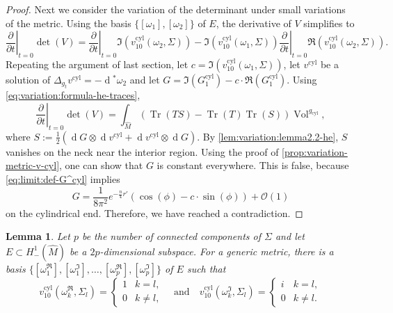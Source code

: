 \documentclass[preprint,12pt]{elsarticle}
\numberwithin{table}{section}
\newtheorem{lemma}{Lemma}[section]
\newcommand{\del}{\partial}
\newcommand{\Vol}{\operatorname{Vol}}
\renewcommand{\d}{\operatorname{d}\!}
\renewcommand{\O}{\mathcal{O}}
\newcommand{\Tr}{\operatorname{Tr}}
\begin{document}
\begin{proof}
	Next we consider the variation of the determinant under small variations of the metric. Using the basis $\{[\omega_1], [\omega_2]\}$ of $E$, the derivative of $V$ simplifies to
	$$
	\left.\frac{\del }{\del t}\right|_{t=0} \det(V) = \left.\frac{\del }{\del t}\right|_{t=0} \Im(v^{\mathrm{cyl}}_{10}(\omega_2, \Sigma)) - \Im(v^{\mathrm{cyl}}_{10}(\omega_1, \Sigma)) \left.\frac{\del }{\del t}\right|_{t=0} \Re(v^{\mathrm{cyl}}_{10}(\omega_2, \Sigma)).
	$$
	Repeating the argument of last section, let $c = \Im(v^{\mathrm{cyl}}_{10}(\omega_1, \Sigma))$, let $v^{\mathrm{cyl}}$ be a solution of $\Delta_{g_{t}} v^{\mathrm{cyl}} = - \d^* \omega_2$ and let $G = \Im(G^{\mathrm{cyl}}_1) - c \cdot \Re(G^{\mathrm{cyl}}_1)$.
	Using \cref{eq:variation:formula-he-traces},
	$$
	\left.\frac{\del }{\del t}\right|_{t=0} \det(V) = \int_{\hat M} (\Tr(TS) - \Tr(T) \Tr(S))\Vol^{g_{\mathrm{cyl}}},
	$$
	where $S := \frac{1}{2} (\d G \otimes \d v^{\mathrm{cyl}} + \d v^{\mathrm{cyl}} \otimes \d G)$.
	By \cref{lem:variation:lemma2.2-he}, $S$ vanishes on the neck near the interior region. Using the proof of \cref{prop:variation-metric-v-cyl}, one can show that $G$ is constant everywhere. This is false, because \cref{eq:limit:def-G^cyl} implies
	$$
	G = \frac{1}{8 \pi^2} e^{ - \frac{n}{4} r'} \left( \cos(\phi) - c \cdot \sin(\phi) \right) + \O(1)
	$$
	on the cylindrical end.
	Therefore, we have reached a contradiction.
\end{proof}
\begin{lemma}
	\label{lem:proof-assumptions-non-connected-case}
	Let $p$ be the number of connected components of $\Sigma$ and let $E \subset H^1_-(\hat{M})$ be a $2p$-dimensional subspace. For a generic metric, there is a basis $\{ [\omega_1^\Re], [\omega_1^\Im], \ldots, [\omega_p^\Re], [\omega_p^\Im]\}$ of $E$ such that 
	$$
	v^{\mathrm{cyl}}_{10}(\omega_k^\Re, \Sigma_l) = \begin{cases}
		1 & k = l, \\
		0 & k \not= l,
	\end{cases}
	\quad \text{and} \quad
	v^{\mathrm{cyl}}_{10}(\omega_k^\Im, \Sigma_l) = \begin{cases}
		i & k = l, \\
		0 & k \not= l.
	\end{cases}
	$$
\end{lemma}
\end{document}
